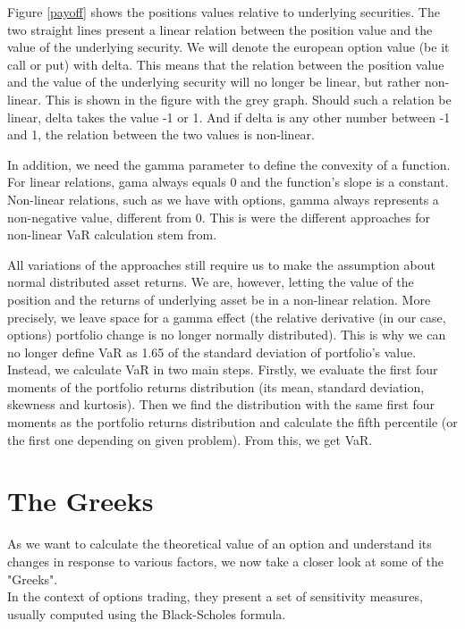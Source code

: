 \documentclass[a4paper, 12pt]{article}
\theoremstyle{definition}
\theoremstyle{plain}
\theoremstyle{definition}
\begin{document}
Figure \ref{payoff} shows the positions values relative to underlying securities.
The two straight lines present a linear relation between the position value and the 
value of the underlying security.
We will denote the european option value (be it call or put) with delta. This means that 
the relation between the position value and the 
value of the underlying security will no longer be linear, but rather non-linear. 
This is shown in the figure with the grey graph. 
Should such a relation be linear, delta takes the value -1 or 1. And if delta is 
any other number between -1 and 1, the relation between the two values is non-linear.

In addition, we need the gamma parameter to define the convexity of a function.
For linear relations, gama always equals 0 and the function's slope is a constant.
Non-linear relations, such as we have with options, gamma always represents a non-negative 
value, different from 0. This is were the different approaches for non-linear VaR calculation 
stem from.

All variations of the approaches still require us to make the assumption about normal distributed 
asset returns. We are, however, letting the value of the position and the returns of underlying asset 
be in a non-linear relation. More precisely, we leave space for a gamma effect (the relative 
derivative (in our case, options) portfolio change is no longer normally distributed).
This is why we can no longer define VaR as 1.65 of the standard deviation of portfolio's value.
Instead, we calculate VaR in two main steps. Firstly, we evaluate the first four moments of the 
portfolio returns distribution (its mean, standard deviation, skewness and kurtosis).
Then we find the distribution with the same first four moments as the portfolio returns distribution
and calculate the fifth percentile (or the first one depending on given problem).
From this, we get VaR.
\newpage

\section{The Greeks}


As we want to calculate the theoretical value of an 
option and understand its changes in response to 
various factors, we now take a closer look at some of the 
"Greeks". \\

In the context of options trading, they present a 
set of sensitivity measures, usually computed 
using the Black-Scholes formula. 
\end{document}
